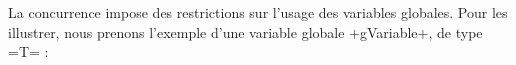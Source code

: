 %
%
%














La concurrence impose des restrictions sur l'usage des variables globales. Pour les illustrer, nous prenons l'exemple d'une variable globale \omnibus+gVariable+, de type \omnibus=T= :

